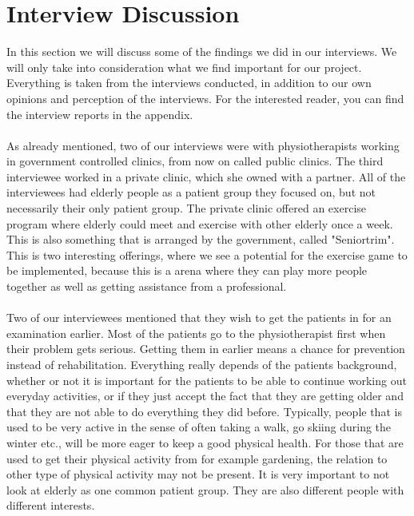\section{Interview Discussion}
In this section we will discuss some of the findings we did in our interviews. We will only take into consideration what we find important for our project. Everything is taken from the interviews conducted, in addition to our own opinions and perception of the interviews. For the interested reader, you can find the interview reports in the appendix.\\ \\
As already mentioned, two of our interviews were with physiotherapists working in government controlled clinics, from now on called public clinics. The third interviewee worked in a private clinic, which she owned with a partner. All of the interviewees had elderly people as a patient group they focused on, but not necessarily their only patient group. The private clinic offered an exercise program where elderly could meet and exercise with other elderly once a week. This is also something that is arranged by the government, called "Seniortrim". This is two interesting offerings, where we see a potential for the exercise game to be implemented, because this is a arena where they can play more people together as well as getting assistance from a professional. \\ \\
Two of our interviewees mentioned that they wish to get the patients in for an examination earlier. Most of the patients go to the physiotherapist first when their problem gets serious. Getting them in earlier means a chance for prevention instead of rehabilitation. Everything really depends of the patients background, whether or not it is important for the patients to be able to continue working out everyday activities, or if they just accept the fact that they are getting older and that they are not able to do everything they did before. Typically, people that is used to be very active in the sense of often taking a walk, go skiing during the winter etc., will be more eager to keep a good physical health. For those that are used to get their physical activity from for example gardening, the relation to other type of physical activity may not be present. It is very important to not look at elderly as one common patient group. They are also different people with different interests.\\ \\
